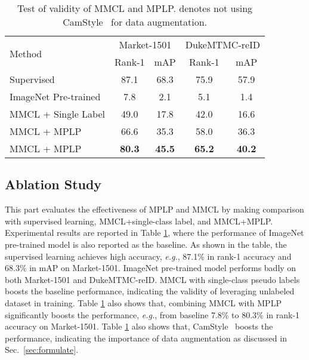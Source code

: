 \documentclass[10pt,twocolumn,letterpaper]{article}
\begin{document}
\begin{table}
\footnotesize
\begin{center}
\begin{tabular}{l||c|c||c|c}
\hline
\multirow{2}{*}{Method} & \multicolumn{2}{c||}{Market-1501} & \multicolumn{2}{c}{DukeMTMC-reID}\\
\cline{2-5}
 & Rank-1 & mAP & Rank-1 & mAP  \\
\hline\hline
Supervised & 87.1 & 68.3 & 75.9 & 57.9 \\
\hline
ImageNet Pre-trained & 7.8 & 2.1 & 5.1 & 1.4 \\
MMCL + Single Label  & 49.0 & 17.8 & 42.0 & 16.6\\
MMCL + MPLP & {66.6} & {35.3} & {58.0} & {36.3} \\
MMCL + MPLP & \textbf{80.3} & \textbf{45.5} & \textbf{65.2} & \textbf{40.2} \\
\hline
\end{tabular}
\end{center}
\vspace{-2mm}
\caption{Test of validity of MMCL and MPLP.  denotes not using CamStyle~\cite{zhong2018camera} for data augmentation.}
\vspace{-2mm}
\label{table:ablation}
\end{table}

\vspace{-1mm}
\subsection{Ablation Study}\label{section:ablation}
\vspace{-1mm}
This part evaluates the effectiveness of MPLP and MMCL by making comparison with supervised learning, MMCL+single-class label, and MMCL+MPLP. Experimental results are reported in Table \ref{table:ablation}, where the performance of ImageNet pre-trained model is also reported as the baseline. As shown in the table, the supervised learning achieves high accuracy, \emph{e.g.}, 87.1\% in rank-1 accuracy and 68.3\% in mAP on Market-1501. ImageNet pre-trained model performs badly on both Market-1501 and DukeMTMC-reID. MMCL with single-class pseudo labels boosts the baseline performance, indicating the validity of leveraging unlabeled dataset in training. Table \ref{table:ablation} also shows that, combining MMCL with MPLP significantly boosts the performance, \emph{e.g.}, from baseline 7.8\% to 80.3\% in rank-1 accuracy on Market-1501. Table \ref{table:ablation} also shows that, CamStyle~\cite{zhong2018camera} boosts the performance, indicating the importance of data augmentation as discussed in Sec.~\ref{sec:formulate}.
\end{document}
